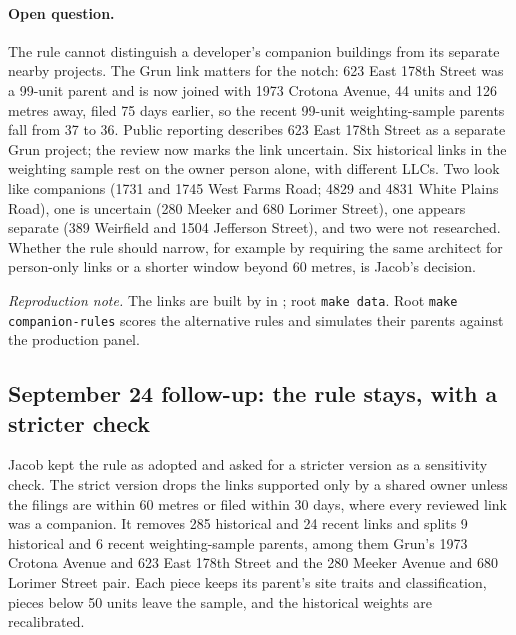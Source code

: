 \paragraph{Open question.} The rule cannot distinguish a developer's companion
buildings from its separate nearby projects. The Grun link matters for the
notch: 623 East 178th Street was a 99-unit parent and is now joined with 1973
Crotona Avenue, 44 units and 126 metres away, filed 75 days earlier, so the
recent 99-unit weighting-sample parents fall from 37 to 36. Public reporting
describes 623 East 178th Street as a separate Grun project; the review now
marks the link uncertain. Six historical links in the weighting sample rest on
the owner person alone, with different LLCs. Two look like companions (1731
and 1745 West Farms Road; 4829 and 4831 White Plains Road), one is uncertain
(280 Meeker and 680 Lorimer Street), one appears separate (389 Weirfield and
1504 Jefferson Street), and two were not researched. Whether the rule should
narrow, for example by requiring the same architect for person-only links or a
shorter window beyond 60 metres, is Jacob's decision.

\textit{Reproduction note.} The links are built by
 in ;
root \texttt{make data}. Root \texttt{make companion-rules} scores the
alternative rules and simulates their parents against the production panel.

\subsection*{September 24 follow-up: the rule stays, with a stricter check}

Jacob kept the rule as adopted and asked for a stricter version as a
sensitivity check. The strict version drops the links supported only by a
shared owner unless the filings are within 60 metres or filed within 30 days,
where every reviewed link was a companion. It removes 285 historical and 24
recent links and splits 9 historical and 6 recent weighting-sample parents,
among them Grun's 1973 Crotona Avenue and 623 East 178th Street and the 280
Meeker Avenue and 680 Lorimer Street pair. Each piece keeps its parent's site
traits and classification, pieces below 50 units leave the sample, and the
historical weights are recalibrated.

